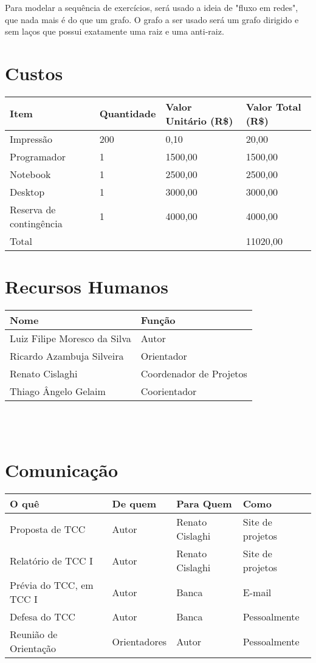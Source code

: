 \documentclass[12pt]{article}
\begin{document}
        Para modelar a sequência de exercícios, será usado a ideia de "fluxo em redes", que nada mais é do que um grafo. O grafo a ser usado será um grafo dirigido e sem laços que possui exatamente uma raiz e uma anti-raiz.

\newpage
\section{Custos}
	\begin{tabular}{l l l l}
		\hline
		Item					&	Quantidade	&	Valor Unitário (R\$)	&	Valor Total (R\$) \\
		\hline
		Impressão	&	200			&	0,10					&	20,00	\\

		Programador	&	1			&	1500,00					&	1500,00	\\
		Notebook	&	1 			&	2500,00					&	2500,00	\\
		Desktop     &   1           &   3000,00                 &   3000,00 \\
		Reserva de contingência	&	1 			&	4000,00					&	4000,00	\\
		\hline
		Total					&				&							&	11020,00
	\end{tabular}

\newpage
\section{Recursos Humanos}
    \begin{tabular}{l l}
        \hline
        Nome            				& Função \\
        \hline
        Luiz Filipe Moresco da Silva    	& Autor \\
        Ricardo Azambuja Silveira   	& Orientador \\
        Renato Cislaghi 				& Coordenador de Projetos \\
        Thiago Ângelo Gelaim            & Coorientador \\
        \hline
    \end{tabular}
    \\
    \\

\newpage
\section{Comunicação}
	\begin{tabular}{l l l l}
		\hline
		O quê  & De quem & Para Quem & Como \\
		\hline
		Proposta de TCC         & Autor		& Renato Cislaghi   & Site de projetos \\
		Relatório de TCC I      & Autor		& Renato Cislaghi   & Site de projetos \\
		Prévia do TCC, em TCC I & Autor		& Banca             & E-mail \\
		Defesa do TCC           & Autor		& Banca             & Pessoalmente \\
		Reunião de Orientação   & Orientadores	& Autor		    & Pessoalmente \\
		\hline
	\end{tabular}
\newpage
\end{document}
